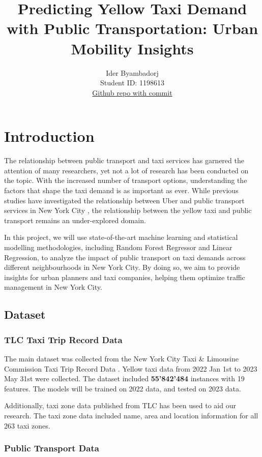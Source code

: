 \documentclass[11pt]{article}
\title{\textbf{Predicting Yellow Taxi Demand with Public Transportation: Urban Mobility Insights}}
\author{
Ider Byambadorj \\
Student ID: 1198613 \\
\href{https://github.com/MAST30034-Applied-Data-Science/mast30034-project-1-iderbyambadorj/commit/80bbdb4091bab2fbb798cfe1722a49a88246dfd2}{Github repo with commit}
}
\begin{document}
\maketitle

\section{Introduction}

The relationship between public transport and taxi services has garnered the attention of many researchers, yet not a lot of research has been conducted on the topic. With the increased number of transport options, understanding the factors that shape the taxi demand is as important as ever. While previous studies have investigated the relationship between Uber and public transport services in New York City \cite{uber_public_transport}, the relationship between the yellow taxi and public transport remains an under-explored domain. 

In this project, we will use state-of-the-art machine learning and statistical modelling methodologies, including Random Forest Regressor and Linear Regression, to analyze the impact of public transport on taxi demands across different neighbourhoods in New York City. By doing so, we aim to provide insights for urban planners and taxi companies, helping them optimize traffic management in New York City.

\subsection{Dataset}
\subsubsection{TLC Taxi Trip Record Data}

The main dataset was collected from the New York City Taxi \& Limousine Commission Taxi Trip Record Data \cite{taxi_data}. Yellow taxi data from 2022 Jan 1st to 2023 May 31st were collected. The dataset included \textbf{55'842'484} instances with 19 features. The models will be trained on 2022 data, and tested on 2023 data.

Additionally, taxi zone data published from TLC has been used to aid our research. The taxi zone data included name, area and location information for all 263 taxi zones.

\subsubsection{Public Transport Data}
\end{document}
